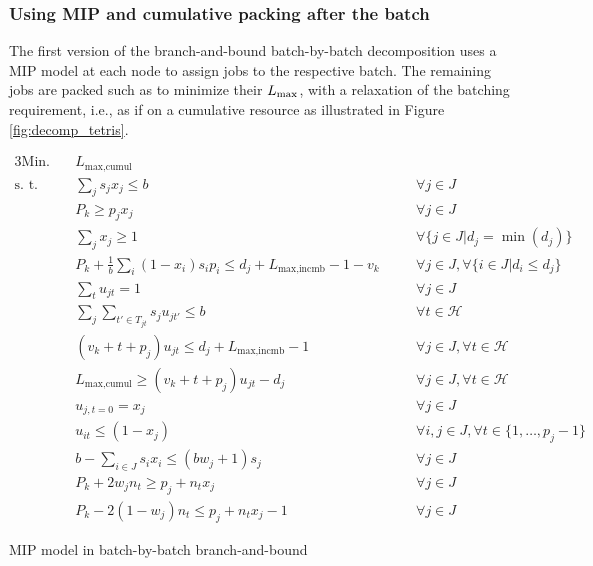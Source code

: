 \documentclass[13pt, letterpaper, oneside]{book}
\begin{document}
\subsubsection{Using MIP and cumulative packing after the batch}


The first version of the branch-and-bound batch-by-batch decomposition uses a
MIP model at each node to assign jobs to the respective batch. The remaining
jobs are packed such as to minimize their $L_{\text{max}}$, with a relaxation of the
batching requirement, i.e., as if on a cumulative resource as illustrated in
Figure \ref{fig:decomp_tetris}. 
\begin{model}[h!]
\begin{alignat}{3}
\text{Min.}\quad & L_{\text{max,cumul}} && \\ 
\text{s. t.}\quad & \label{dc:eq1} \sum_j s_j x_j \leq b \quad && \forall j \in J \\
& P_k \geq p_j x_j \quad && \forall j \in J \\
& \label{dc:eq3} \sum_j x_j \geq 1 \quad && \forall \{j \in J | d_j = \min(d_j)\} \\
& \label{dc:eq4} P_k + \frac{1}{b} \sum_{i} (1-x_i) s_i p_i \leq d_j +
L_{\text{max,incmb}} - 1 - v_k \quad && \forall j \in J, \forall \{i \in J | d_i
\leq d_j\} \\[2ex]
& \label{dc:eq5} \sum_t u_{jt} = 1 \quad && \forall j \in J \\
& \label{dc:eq6} \sum_j \sum_{t' \in T_{jt}} s_j u_{jt'} \leq b \quad && \forall t \in \mathcal{H} \\
& \label{dc:eq7} (v_k + t + p_j) u_{jt} \leq d_j + L_{\text{max,incmb}} - 1 \quad && \forall j \in J, \forall t \in \mathcal{H} \\
& \label{dc:eq8} L_{\text{max,cumul}} \geq (v_k + t + p_j) u_{jt} - d_j \quad && \forall j \in J, \forall t \in \mathcal{H} \\
& \label{dc:eq9} u_{j,t=0} = x_j \quad && \forall j \in J \\
& \label{dc:eq10} u_{it} \leq (1 - x_j) \quad && \forall i,j \in J, \forall t
\in \{1, \dots, p_j - 1\} \\[2ex]
& \label{dc:eq11} b - \sum_{i \in J} s_i x_i \leq (b w_j + 1) s_j \quad && \forall j \in J \\
& \label{dc:eq12} P_k + 2w_j n_t \geq p_j + n_t x_j \quad && \forall j \in J\\
& \label{dc:eq13} P_k - 2(1 - w_j)n_t \leq p_j +n_t x_j - 1 \quad && \forall j
\in J
\end{alignat}
\caption{MIP model in batch-by-batch branch-and-bound}
\label{model:decomp_mip}
\end{model}
\end{document}
